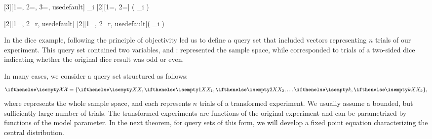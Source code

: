 \newcommand{\ratio}[1]{\frac{\avgPost[{#1}][\cMass{}]}{\cMass{#1}}}
[3][1=\w, 2=\w, 3=\cMass{}, usedefault]{
    \prod_i 
}
[2][1={\avgPost[][\cMass{}]}, 2=\cMass{}]{
    \left( \prod_i  \right)
}
\newcommand{\fixedPoint}{\normConst \solPrior}
\newcommand{\fpMap}[1]{T \ifthenelse{\isempty{#1}}{}{\left[#1\right]}}
\newcommand{\normConst}{\mu}
\newcommand{\solPrior}{r}
\newcommand{\solDist}{R}

[2][1={\w[i]}, 2=\solPrior, usedefault]{
}
[2][1=\w, 2=\solPrior, usedefault]{\left( \leg[{#1}][{#2}] \prod_i \leg[{\w[i]}][{#2}] \right)}
\newcommand{\unnorm}{\rho}

In the dice example, following the principle of objectivity led us to define a query set that included vectors
representing $n$ trials of our experiment.
This query set contained two variables, \X and \Y: \X represented the sample space,
while \Y corresponded to trials of a two-sided dice indicating whether the original dice result was odd or even.

In many cases, we consider a query set structured as follows:
\[
    \Qset = \{\X, \seqRv{k}\},
\] where \X represents the whole sample space, and each \X[i] represents $n$ trials of a transformed experiment.
We usually assume a bounded, but sufficiently large number of trials.
The transformed experiments are functions of the original experiment and can be parametrized by functions of the
model parameter.
In the next theorem, for query sets of this form, we will develop a fixed point equation characterizing the
central distribution.



